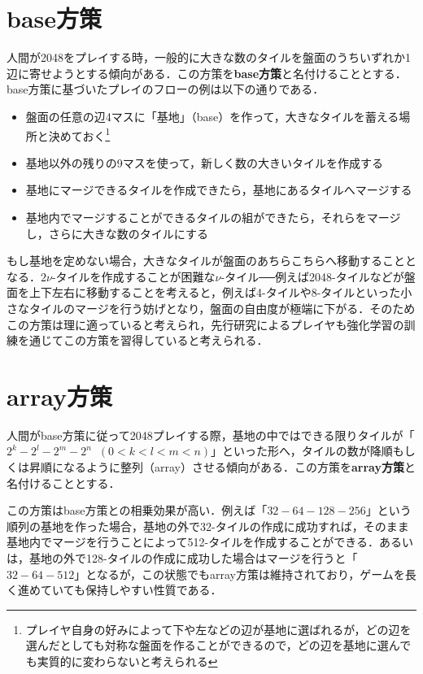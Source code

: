 \documentclass{suribt}
\begin{document}
\section{base方策}
人間が2048をプレイする時，一般的に大きな数のタイルを盤面のうちいずれか1辺に寄せようとする傾向がある．この方策を\textbf{base方策}と名付けることとする．base方策に基づいたプレイのフローの例は以下の通りである．

\begin{itemize}
\item 盤面の任意の辺4マスに「基地」（base）を作って，大きなタイルを蓄える場所と決めておく\footnote{プレイヤ自身の好みによって下や左などの辺が基地に選ばれるが，どの辺を選んだとしても対称な盤面を作ることができるので，どの辺を基地に選んでも実質的に変わらないと考えられる}
\item 基地以外の残りの9マスを使って，新しく数の大きいタイルを作成する
\item 基地にマージできるタイルを作成できたら，基地にあるタイルへマージする
\item 基地内でマージすることができるタイルの組ができたら，それらをマージし，さらに大きな数のタイルにする
\end{itemize}

もし基地を定めない場合，大きなタイルが盤面のあちらこちらへ移動することとなる．$2{\nu}$-タイルを作成することが困難な${\nu}$-タイル──例えば2048-タイルなどが盤面を上下左右に移動することを考えると，例えば4-タイルや8-タイルといった小さなタイルのマージを行う妨げとなり，盤面の自由度が極端に下がる．そのためこの方策は理に適っていると考えられ，先行研究によるプレイヤも強化学習の訓練を通じてこの方策を習得していると考えられる．

\section{array方策}
人間がbase方策に従って2048プレイする際，基地の中ではできる限りタイルが「$2^{k}-2^{l}-2^{m}-2^{n} \;\; (0<k<l<m<n)$」といった形へ，タイルの数が降順もしくは昇順になるように整列（array）させる傾向がある．この方策を\textbf{array方策}と名付けることとする．

この方策はbase方策との相乗効果が高い．例えば「$32-64-128-256$」という順列の基地を作った場合，基地の外で32-タイルの作成に成功すれば，そのまま基地内でマージを行うことによって512-タイルを作成することができる．あるいは，基地の外で128-タイルの作成に成功した場合はマージを行うと「$32-64-512$」となるが，この状態でもarray方策は維持されており，ゲームを長く進めていても保持しやすい性質である．
\end{document}
